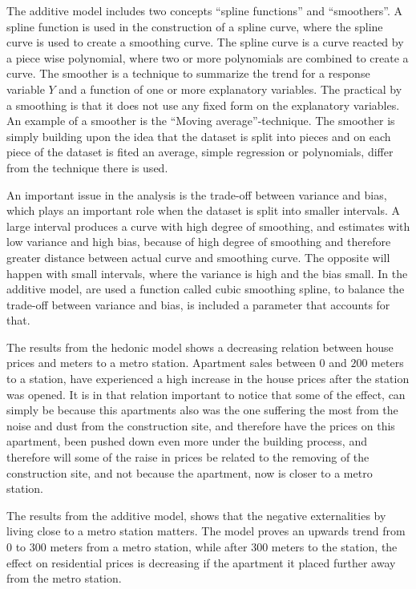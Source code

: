 The additive model includes two concepts ``spline functions'' and ``smoothers''.  
A spline function is used in the construction of a spline curve, where the 
spline curve is used to create a smoothing curve. The spline curve is a curve 
reacted by a piece wise polynomial, where two or more polynomials are combined 
to create a curve. The smoother is a technique to summarize the trend for a 
response variable $Y$ and a function of one or more explanatory variables. The 
practical by a smoothing is that it does not use any fixed form on the 
explanatory variables.  An example of a smoother is the 
``Moving average''-technique. The smoother is simply building upon the idea that 
the dataset is split into pieces and on each piece of the dataset is 
fited an average, simple regression or polynomials, differ from the technique
there is used.

An important issue in the analysis is the trade-off between variance and 
bias, which plays an important role when the dataset is split into smaller 
intervals. A large interval produces a curve with high degree of smoothing, 
and estimates with low variance and high bias, because of high degree of 
smoothing and therefore greater distance between actual curve and smoothing 
curve.  The opposite will happen with small intervals, where the variance is 
high and the bias small.  In the additive model, are used a function called 
cubic smoothing spline, to balance the trade-off between variance and 
bias, is included a parameter that accounts for that. 

The results from the hedonic model shows a decreasing relation between house prices and 
meters to a metro station. Apartment sales between $0$ and $200$ meters to a 
station, have experienced a high increase in the house prices after the 
station was opened. It is in that relation important to notice that some of 
the 
effect, can simply be because this apartments also was the one suffering the 
most from the noise and dust from the construction site, and therefore have
the prices on this apartment, been pushed down even more under the building 
process, and therefore will some of the raise in prices be related to the 
removing of the construction site, and not because the apartment, now is 
closer to a metro station.

The results from the additive model, shows that the negative externalities by 
living close to a metro station matters. The model proves an upwards trend 
from $0$ to $300$ meters from a metro station, while after $300$ meters to the station, 
the effect on residential prices is decreasing if the apartment it placed further away 
from the metro station.   

